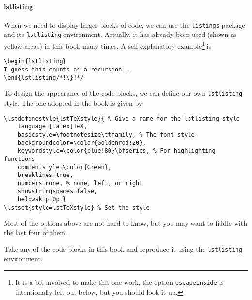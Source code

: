 \paragraph{lstlisting}
When we need to display larger blocks of code, we can use the \verb|listings| package and its \verb|lstlisting| environment. Actually, it has already been used (shown as yellow areas) in this book many times. A self-explanatory example\footnote{It is a bit involved to make this one work, the option \texttt{escapeinside} is intentionally left out below, but you should look it up.} is
\begin{lstlisting}
\begin{lstlisting}
I guess this counts as a recursion...
\end{lstlisting/*!\}!*/
\end{lstlisting}
To design the appearance of the code blocks, we can define our own \verb|lstlisting| style. The one adopted in the book is given by
\begin{lstlisting}
\lstdefinestyle{lstTeXstyle}{ % Give a name for the lstlisting style
    language=[latex]TeX, 
    basicstyle=\footnotesize\ttfamily, % The font style
    backgroundcolor=\color{Goldenrod!20},
    keywordstyle=\color{blue!80}\bfseries, % For highlighting functions
    commentstyle=\color{Green},
    breaklines=true, 
    numbers=none, % none, left, or right
    showstringspaces=false,
    belowskip=0pt}
\lstset{style=lstTeXstyle} % Set the style
\end{lstlisting}
Most of the options above are not hard to know, but you may want to fiddle with the last four of them.

\begin{exercisebox}
\begin{Exercise}
Take any of the code blocks in this book and reproduce it using the \verb|lstlisting|  environment.
\end{Exercise}
\end{exercisebox}
